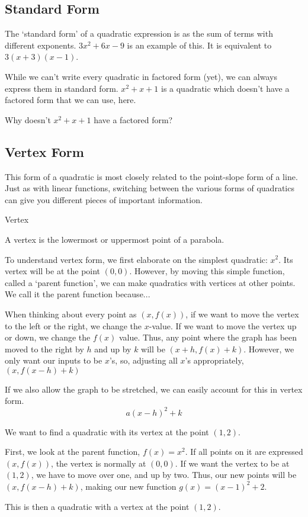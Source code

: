 \subsection*{Standard Form}

The `standard form' of a quadratic expression is as the sum of terms with different exponents.  $3x^2 + 6x - 9$ is an example of this.  It is equivalent to $3(x + 3)(x - 1)$.

While we can't write every quadratic in factored form (yet), we can always express them in standard form.  $x^2 +x+ 1$ is a quadratic which doesn't have a factored form that we can use, here.

\begin{prblm}
Why doesn't $x^2 +x + 1$ have a factored form?
\end{prblm}

\subsection*{Vertex Form}

This form of a quadratic is most closely related to the point-slope form of a line.  Just as with linear functions, switching between the various forms of quadratics can give you different pieces of important information.

\begin{defn} Vertex

A vertex is the lowermost or uppermost point of a parabola.
\end{defn}

To understand vertex form, we first elaborate on the simplest quadratic: $x^2$.  Its vertex will be at the point $(0,0)$.  However, by moving this simple function, called a `parent function', we can make quadratics with vertices at other points.  We call it the parent function because...

When thinking about every point as $(x, f(x))$, if we want to move the vertex to the left or the right, we change the $x$-value.  If we want to move the vertex up or down, we change the $f(x)$ value.  Thus, any point where the graph has been moved to the right by $h$ and up by $k$ will be $(x + h, f(x) + k)$.  However, we only want our inputs to be $x$'s, so, adjusting all $x$'s appropriately, $(x, f(x-h)+k)$

If we also allow the graph to be stretched, we can easily account for this in vertex form.  $$a(x-h)^2 + k$$

\begin{example}

We want to find a quadratic with its vertex at the point $(1,2)$.

First, we look at the parent function, $f(x) = x^2$.  If all points on it are expressed $(x, f(x))$, the vertex is normally at $(0,0)$.  If we want the vertex to be at $(1,2)$, we have to move over one, and up by two.  Thus, our new points will be $(x, f(x-h)+k)$, making our new function $g(x) = (x-1)^2 + 2$.

This is then a quadratic with a vertex at the point $(1,2)$.

\end{example}

